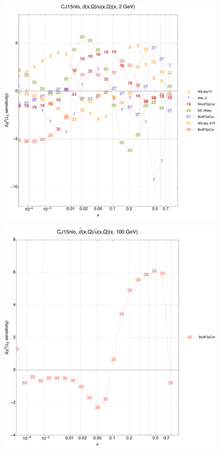 \documentclass[10pt,aps,prd,floatfix,titlepage]{revtex4}
\begin{document}
\begin{figure}
\includegraphics[width=\textwidth,height=0.44\textheight,keepaspectratio]{2/rat_ifl3_CJ15nlo_L2_q2_Sf_2.pdf}
\caption{}
\end{figure}
\clearpage
\begin{figure}
\includegraphics[width=\textwidth,height=0.44\textheight,keepaspectratio]{2/rat_ifl4_CJ15nlo_L2_q100_Sf_2.pdf}
\caption{}
\end{figure}
\end{document}
